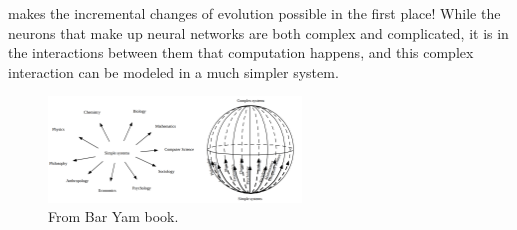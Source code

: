 makes the incremental changes of evolution possible in the first place!
%
While the neurons that make up neural networks are both complex and complicated,
it is in the interactions between them that computation happens, and this
complex interaction can be modeled in a much simpler system.
\par
\begin{figure}[h!]
  \centering
  \includegraphics[width=0.6\textwidth]{fig/BarYamCX.png}
  \caption{From Bar Yam book.}
  \label{figCX}
\end{figure}
